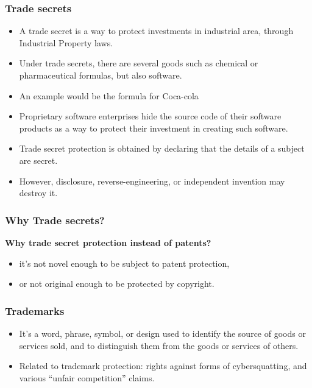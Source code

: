 

\begin{frame}
\frametitle{Trade secrets}

\begin{itemize}
\item A trade secret is a way to protect investments in industrial area,
through Industrial Property laws.
\item Under trade secrets, there are several goods such as chemical or pharmaceutical
formulas, but also software.
\item An example would be the formula for Coca-cola
\item Proprietary software enterprises hide the source code of their
software products as a way to protect their investment in creating
such software.
\item Trade secret protection is obtained by declaring that the details
of a subject are secret.
\item However, disclosure, reverse-engineering, or independent invention may destroy it.
\end{itemize}

\end{frame}


\begin{frame}
\frametitle{Why Trade secrets?}

\begin{center}
\textbf{Why trade secret protection instead of patents?}
\end{center}

\pause

\begin{itemize}
\item it's not novel enough to be subject to patent protection, 
\item or not original enough to be protected by copyright.
\end{itemize}

\end{frame}



\begin{frame}
\frametitle{Trademarks}

\begin{itemize}
\item It's a word, phrase, symbol, or design used to identify
the source of goods or services sold, and to distinguish them from the
goods or services of others. 
\item Related to trademark protection: rights against forms of cybersquatting, 
and various ``unfair competition'' claims.
\end{itemize}

\end{frame}

